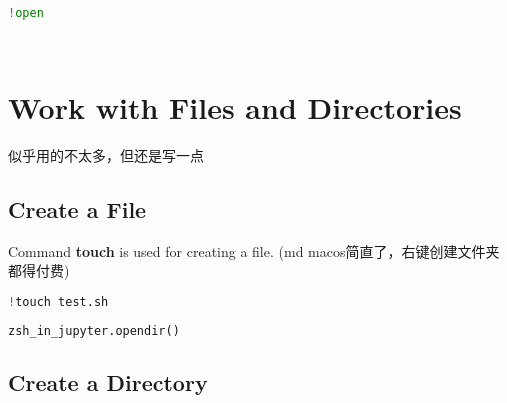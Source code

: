 \documentclass[
]{article}
\begin{document}
\hypertarget{26e90691}{}
\begin{lstlisting}[language=Python]
!open 
\end{lstlisting}

\hypertarget{2c6881f1}{}
\begin{lstlisting}[language=Python]
\end{lstlisting}

\hypertarget{5de6e2f3}{}
\begin{lstlisting}[language=Python]
\end{lstlisting}

\hypertarget{4ce8b5a7}{}
\hypertarget{work-with-files-and-directories}{%
\section{Work with Files and
Directories}\label{work-with-files-and-directories}}

似乎用的不太多，但还是写一点

\hypertarget{fee21310}{}
\hypertarget{create-a-file}{%
\subsection{Create a File}\label{create-a-file}}

Command \textbf{touch} is used for creating a file. (md
macos简直了，右键创建文件夹都得付费)

\hypertarget{fe2faaec}{}
\begin{lstlisting}[language=Python]
!touch test.sh
\end{lstlisting}

\hypertarget{22504561}{}
\begin{lstlisting}[language=Python]
zsh_in_jupyter.opendir()
\end{lstlisting}

\hypertarget{989345a2}{}
\hypertarget{create-a-directory}{%
\subsection{Create a Directory}\label{create-a-directory}}

\hypertarget{2cf3ca8f}{}
\begin{lstlisting}[language=Python]
\end{lstlisting}

\hypertarget{bc0b18fa}{}
\begin{lstlisting}[language=Python]
\end{lstlisting}
\end{document}
